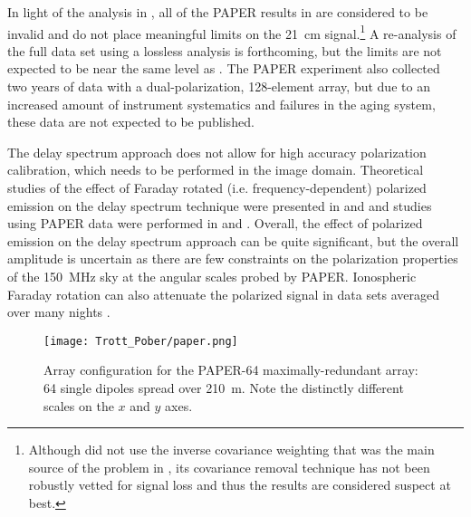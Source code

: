 In light of the analysis in \cite{cheng18}, all of the PAPER results in \cite{parsons14,jacobs15,ali15} are considered to be invalid and do not place meaningful limits on the 21~cm signal.\footnote{Although \cite{parsons14} did not use the inverse covariance weighting that was the main source of the problem in \cite{ali15}, its covariance removal technique has not been robustly vetted for signal loss and thus the results are considered suspect at best.} A re-analysis of the full \cite{ali15} data set using a lossless analysis is forthcoming, but the limits are not expected to be near the same level as \cite{ali15}.  The PAPER experiment also collected two years of data with a dual-polarization, 128-element array, but due to an increased amount of instrument systematics and failures in the aging system, these data are not expected to be published.

The delay spectrum approach does not allow for high accuracy polarization calibration, which needs to be performed in the image domain.  Theoretical studies of the effect of Faraday rotated (i.e. frequency-dependent) polarized emission on the delay spectrum technique were presented in \cite{moore13} and \cite{nunhokee17} and studies using PAPER data were performed in \cite{moore17} and \cite{kohn16}.  Overall, the effect of polarized emission on the delay spectrum approach can be quite significant, but the overall amplitude is uncertain as there are few constraints on the polarization properties of the 150~MHz sky at the angular scales probed by PAPER.  Ionospheric Faraday rotation can also attenuate the polarized signal in data sets averaged over many nights \cite{martinot18}.
\begin{figure}[ht]
\centering
\texttt{[image: Trott\_Pober/paper.png]}
\caption{Array configuration for the PAPER-64 maximally-redundant array: 64 single dipoles spread over 210~m.  Note the distinctly different scales on the $x$ and $y$ axes.}\label{fig:paper}
\end{figure}

